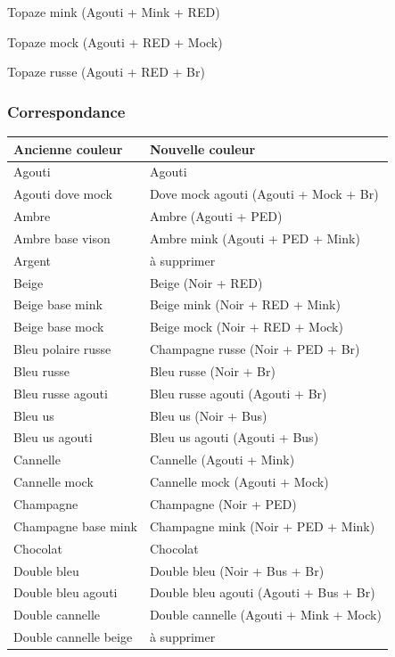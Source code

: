 \documentclass[a4paper,10pt]{article}
\begin{document}
Topaze mink (Agouti + Mink + RED)
 
Topaze mock (Agouti + RED + Mock)
 
Topaze russe (Agouti + RED + Br)

\subsubsection{Correspondance}

\begin{center}\begin{tabular}{|l|l|}\hline
\textbf{Ancienne couleur} & \textbf{Nouvelle couleur} \\\hline
Agouti& Agouti  \\\hline
Agouti dove mock& Dove mock agouti (Agouti + Mock + Br) \\\hline
Ambre& Ambre (Agouti + PED)\\\hline
Ambre base vison& Ambre mink   (Agouti + PED + Mink)\\\hline
Argent& à supprimer \\\hline
Beige& Beige (Noir + RED)\\\hline
Beige base mink& Beige mink  (Noir   + RED + Mink)\\\hline
Beige base mock& Beige mock  (Noir   + RED + Mock)\\\hline
Bleu polaire russe& Champagne russe (Noir + PED + Br)\\\hline
Bleu russe& Bleu russe (Noir + Br)\\\hline
Bleu russe agouti& Bleu russe agouti (Agouti + Br)\\\hline
Bleu us& Bleu us (Noir + Bus)\\\hline
Bleu us agouti& Bleu us agouti (Agouti + Bus)\\\hline
Cannelle& Cannelle (Agouti + Mink)\\\hline
Cannelle mock& Cannelle mock (Agouti + Mock)\\\hline
Champagne& Champagne (Noir + PED)\\\hline
Champagne base mink& Champagne mink (Noir + PED + Mink)\\\hline
Chocolat& Chocolat \\\hline
Double bleu& Double bleu (Noir + Bus + Br)\\\hline
Double bleu agouti& Double bleu agouti (Agouti + Bus + Br)\\\hline
Double cannelle& Double cannelle (Agouti + Mink + Mock)\\\hline
Double cannelle beige & à supprimer \\\hline

\end{tabular}
\end{center}
\end{document}
